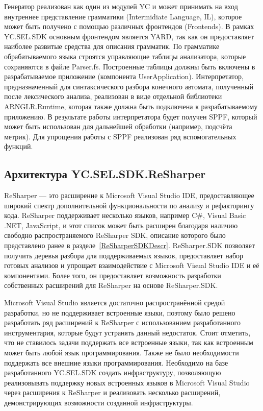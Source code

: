 Генератор реализован как один из модулей YC и может принимать на вход внутреннее представление грамматики (Intermidiate Language, IL), которое может быть получено с помощью различных фронтендов (Frontends). В рамках YC.SEL.SDK основным фронтендом является YARD, так как он предоставляет наиболее развитые средства для описания грамматик. По грамматике обрабатываемого языка строятся управляющие таблицы анализатора, которые сохраняются в файле Parser.fs. 
Построенные таблицы должны быть включены в разрабатываемое приложение (компонента UserApplication). Интерпретатор, предназначенный для синтаксического разбора конечного автомата, полученный после лексического анализа, реализован 
в виде отдельной библиотеки ARNGLR.Runtime, которая также должна быть подключена к разрабатываемому приложению. В результате работы интерпретатора будет получен SPPF, который может быть использован для дальнейшей 
обработки (например, подсчёта метрик). Для упрощения работы с SPPF реализован ряд вспомогательных функций.

\subsection{Архитектура YC.SEL.SDK.ReSharper}

ReSharper --- это расширение к Microsoft Visual Studio IDE, предоставляющее широкий спектр  дополнительной функциональности по анализу и рефакторингу кода. ReSharper поддерживает несколько языков, например C\#, Visual Basic .NET, JavaScript, и этот список может быть расширен благодаря наличию свободно распространяемого ReSharper SDK, описание которого было представлено ранее в разделе~\ref{ReSharperSDKDescr}. ReSharper.SDK позволяет получить деревья разбора для поддерживаемых языков, предоставляет набор готовых анализов и упрощает взаимодействие с Microsoft Visual Studio IDE и её компонентами. Более того, он предоставляет возможность разработки собственных расширений для ReSharper на основе ReSharper.SDK.

Microsoft Visual Studio является достаточно распространённой средой разработки, но не поддерживает встроенные языки, поэтому было решено разработать ряд расширений к ReSharper с использованием разработанного инструментария, которые будут устранять данный недостаток. Стоит отметить, что не ставилось задачи поддержать все встроенные языки, так как встроенным может быть любой язык программирования. Также не было необходимости поддержать все внешние языки программирования. Необходимо на базе разработанного YC.SEL.SDK создать инфраструктуру, позволяющую реализовывать поддержку новых встроенных языков в Microsoft Visual Studio через расширения к ReSharper и реализовать несколько расширений, демонстрирующих возможности созданной инфраструктуры. 

